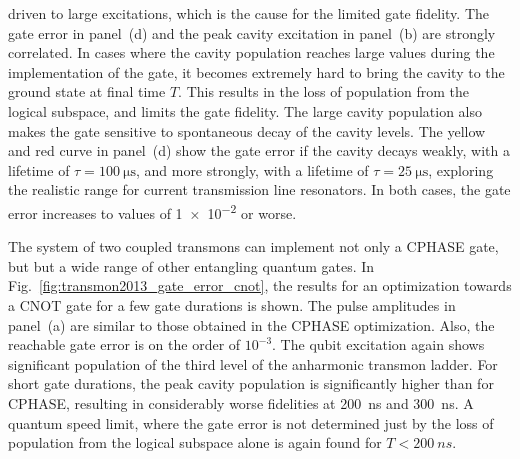 driven to large excitations, which is the cause for the limited gate fidelity.
The gate error in panel~(d) and the peak cavity excitation in panel~(b) are
strongly correlated. In cases where the cavity population reaches large values
during the implementation of the gate, it becomes extremely hard to bring the
cavity to the ground state at final time $T$. This results in the loss of
population from the logical subspace, and limits the gate fidelity. The large
cavity population also makes the gate sensitive to spontaneous decay of the
cavity levels. The yellow and red curve in panel~(d) show the gate error if the
cavity decays weakly, with a lifetime of $\tau = \SI{100}{\micro\second}$, and
more strongly, with a lifetime of $\tau = \SI{25}{\micro\second}$, exploring the
realistic range for current transmission line resonators. In both cases, the gate
error increases to values of \num{1e-2} or worse.

The system of two coupled transmons can implement not only a CPHASE gate, but
but a wide range of other entangling quantum gates. In
Fig.~\ref{fig:transmon2013_gate_error_cnot}, the results for an optimization
towards a CNOT gate for a few gate durations is shown. The pulse amplitudes in
panel~(a) are similar to those obtained in the CPHASE optimization. Also, the
reachable gate error is on the order of $10^{-3}$. The qubit excitation again
shows significant population of the third level of the anharmonic transmon
ladder. For short gate durations, the peak cavity population is significantly
higher than for CPHASE, resulting in considerably worse fidelities at
\SI{200}{ns} and \SI{300}{ns}. A quantum speed limit, where the gate error is
not determined just by the loss of population from the logical subspace alone is
again found for $T<\SI{200}{ns}$.

